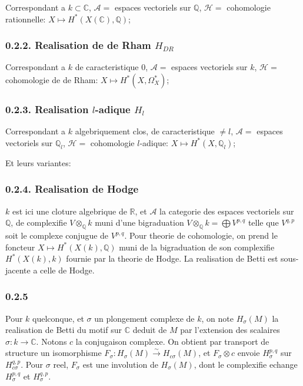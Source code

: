 \documentclass[12pt,a4paper]{article}
\theoremstyle{plain}
\theoremstyle{definition}
\theoremstyle{remark}
\newcommand{\Q}{\mathbb{Q}}
\newcommand{\R}{\mathbb{R}}
\newcommand{\C}{\mathbb{C}}
\begin{document}
Correspondant a $k \subset \C$, $\mathcal{A} =$ espaces vectoriels sur $\Q$,
$\mathcal{H} =$ cohomologie rationnelle: $X \mapsto H^*(X(\C), \Q)$;

\subsubsection*{0.2.2. Realisation de de Rham $H_{DR}$}

Correspondant a $k$ de caracteristique $0$, $\mathcal{A} =$ espaces vectoriels sur $k$,
$\mathcal{H} =$ cohomologie de de Rham: $X \mapsto H^*(X, \Omega^*_X)$;

\subsubsection*{0.2.3. Realisation $l$-adique $H_l$}

Correspondant a $k$ algebriquement clos, de caracteristique $\neq l$,
$\mathcal{A} =$ espaces vectoriels sur $\Q_l$, $\mathcal{H} =$ cohomologie $l$-adique:
$X \mapsto H^*(X, \Q_l)$;

Et leurs variantes:

\subsubsection*{0.2.4. Realisation de Hodge}

$k$ est ici une cloture algebrique de $\R$, et $\mathcal{A}$ la categorie des espaces vectoriels
sur $\Q$, de complexifie $V \otimes_{\Q} k$ muni d'une bigraduation
$V \otimes_{\Q} k = \bigoplus V^{p,q}$ telle que $V^{q,p}$ soit le complexe conjugue de $V^{p,q}$.
Pour theorie de cohomologie, on prend le foncteur $X \mapsto H^*(X(k), \Q)$ muni de la
bigraduation de son complexifie $H^*(X(k), k)$ fournie par la theorie de Hodge. La
realisation de Betti est sous-jacente a celle de Hodge.

\subsubsection*{0.2.5}

Pour $k$ quelconque, et $\sigma$ un plongement complexe de $k$, on note $H_\sigma(M)$ la
realisation de Betti du motif sur $\C$ deduit de $M$ par l'extension des scalaires
$\sigma: k \to \C$. Notons $c$ la conjugaison complexe. On obtient par transport de structure
un isomorphisme $F_\sigma: H_\sigma(M) \xrightarrow{\sim} H_{c\sigma}(M)$, et $F_\sigma \otimes c$ envoie
$H_\sigma^{p,q}$ sur $H_{c\sigma}^{q,p}$. Pour $\sigma$ reel, $F_\sigma$ est une involution de $H_\sigma(M)$, dont le
complexifie echange $H_\sigma^{p,q}$ et $H_\sigma^{q,p}$.
\end{document}
